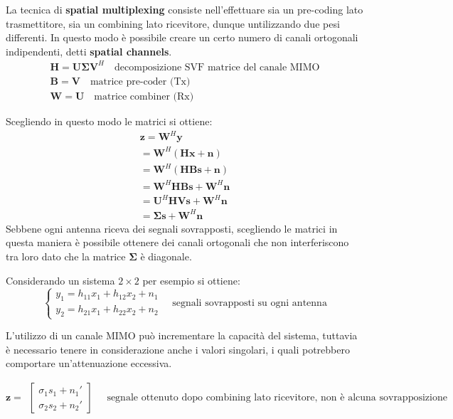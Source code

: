 La tecnica di \textbf{spatial multiplexing} consiste nell'effettuare sia un pre-coding lato trasmettitore, sia un combining lato ricevitore, dunque untilizzando due pesi differenti. In questo modo è possibile creare un certo numero di canali ortogonali indipendenti, detti \textbf{spatial channels}.
\[
    \begin{array}{ll}
        \mathbf{H} = \mathbf{U} \mathbf{\Sigma} \mathbf{V}^H \quad \text{decomposizione SVF matrice del canale MIMO} \\
        \mathbf{B} = \mathbf{V} \quad \text{matrice pre-coder (Tx)} \\
        \mathbf{W} = \mathbf{U} \quad \text{matrice combiner (Rx)}
    \end{array}
\]

Scegliendo in questo modo le matrici si ottiene:
\[
    \begin{array}{ll}
        \mathbf{z} = \mathbf{W}^H \mathbf{y}  \\
        = \mathbf{W}^H \left( \mathbf{H} \mathbf{x} + \mathbf{n}  \right) \\  
        = \mathbf{W}^H \left( \mathbf{H} \mathbf{B} \mathbf{s} + \mathbf{n} \right) \\
        = \mathbf{W}^H \mathbf{H} \mathbf{B} \mathbf{s} + \mathbf{W}^H \mathbf{n}  \\
        = \mathbf{U}^H \mathbf{H} \mathbf{V} \mathbf{s} + \mathbf{W}^H \mathbf{n} \\
        = \mathbf{\Sigma} \mathbf{s} + \mathbf{W}^H \mathbf{n}
    \end{array}
\]
Sebbene ogni antenna riceva dei segnali sovrapposti, scegliendo le matrici in questa maniera è possibile ottenere dei canali ortogonali che non interferiscono tra loro dato che la matrice $\mathbf{\Sigma}$ è diagonale.

Considerando un sistema $2 \times 2$ per esempio si ottiene:
\[
    \begin{cases*}
        y_1 = h_{11} x_1 + h_{12} x_2 + n_1 \\
        y_2 = h_{21} x_1 + h_{22} x_2 + n_2
    \end{cases*}
    \quad
    \text{segnali sovrapposti su ogni antenna}
\]

L'utilizzo di un canale MIMO può incrementare la capacità del sistema, tuttavia è necessario tenere in considerazione anche i valori singolari, i quali potrebbero comportare un'attenuazione eccessiva.


\[
    \mathbf{z} = \begin{matrix}
        \begin{bmatrix}
            \sigma_1 s_1 + n_1' \\
            \sigma_2 s_2 + n_2'
        \end{bmatrix}
    \end{matrix}
    \quad 
    \text{segnale ottenuto dopo combining lato ricevitore, non è alcuna sovrapposizione}
\]


